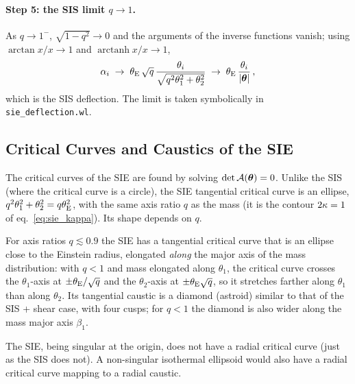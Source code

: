 \paragraph{Step 5: the SIS limit $q \to 1$.}
As $q\to 1^-$, $\sqrt{1-q^2}\to 0$ and the arguments of the inverse
functions vanish; using $\arctan x / x \to 1$ and $\operatorname{arctanh} x/x \to 1$,
\begin{equation*}
    \alpha_i \;\to\; \theta_{\mathrm{E}}\,\sqrt{q}\,\frac{\theta_i}{\sqrt{q^2\theta_1^2+\theta_2^2}}
          \;\to\; \theta_{\mathrm{E}}\,\frac{\theta_i}{|\boldsymbol{\theta}|}\,,
\end{equation*}
which is the SIS deflection.  The limit is taken symbolically in
\texttt{sie\_deflection.wl}.

\subsection{Critical Curves and Caustics of the SIE}

The critical curves of the SIE are found by solving
$\det\mathcal{A}(\boldsymbol{\theta}) = 0$.  Unlike the SIS (where the critical
curve is a circle), the SIE tangential critical curve is an
ellipse, $q^2\theta_1^2 + \theta_2^2 = q\theta_{\mathrm{E}}^2$, with the same
axis ratio $q$ as the mass (it is the contour $2\kappa = 1$ of
eq.~\eqref{eq:sie_kappa}).  Its shape depends on $q$.

For axis ratios $q \lesssim 0.9$ the SIE has a tangential critical
curve that is an ellipse close to the Einstein radius, elongated
\emph{along} the major axis of the mass distribution: with $q < 1$
and mass elongated along $\theta_1$, the critical curve crosses the
$\theta_1$-axis at $\pm\theta_{\mathrm{E}}/\sqrt{q}$ and the $\theta_2$-axis at
$\pm\theta_{\mathrm{E}}\sqrt{q}$, so it stretches farther along $\theta_1$ than
along $\theta_2$.  Its tangential caustic is a diamond (astroid)
similar to that of the SIS + shear case, with four cusps; for
$q < 1$ the diamond is also wider along the mass major axis
$\beta_1$.

The SIE, being singular at the origin, does not have a radial
critical curve (just as the SIS does not).  A non-singular
isothermal ellipsoid would also have a radial critical curve mapping
to a radial caustic.

